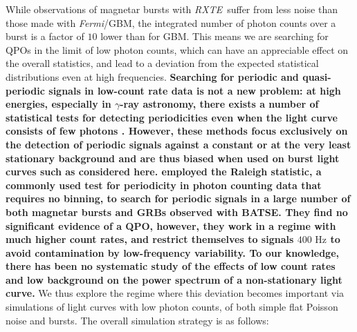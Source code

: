 \documentclass[numberedappendix]{emulateapj}
\newcommand{\hz}{\,\mathrm{Hz}}
\newcommand{\project}[1]{\textsl{#1}}
\newcommand{\fermi}{\project{Fermi}}
\newcommand{\rxte}{\project{RXTE}}
\begin{document}
While observations of magnetar bursts with \rxte\ suffer from less noise than those made with \fermi/GBM, the integrated number of photon counts over a burst is a factor of $10$ lower than for GBM. This means we are searching for QPOs in the limit of low photon counts, which can have an appreciable effect on the overall statistics, and lead to a deviation from the expected statistical distributions even at high frequencies.  \textbf{Searching for periodic and quasi-periodic signals in low-count rate data is not a new problem: at high energies, especially in $\gamma$-ray astronomy, there exists a number of statistical tests for detecting periodicities even when the light curve consists of few photons \citep[e.g.][]{buccheri1983,dejager1988}. However, these methods focus exclusively on the detection of periodic signals against a constant or at the very least stationary background and are thus biased when used on burst light curves such as considered here. \citet{kruger2002} employed the Raleigh statistic, a commonly used test for periodicity in photon counting data that requires no binning, to search for periodic signals in a large number of both magnetar bursts and GRBs observed with BATSE. They find no significant evidence of a QPO, however, they work in a regime with much higher count rates, and restrict themselves to signals $400\,\hz$ to avoid contamination by low-frequency variability. To our knowledge, there has been no systematic study of the effects of low count rates and low background on the power spectrum of a non-stationary light curve.} We thus explore the regime where this deviation becomes important via simulations of light curves with low photon counts, of both simple flat Poisson noise and bursts.
The overall simulation strategy is as follows:
\end{document}
